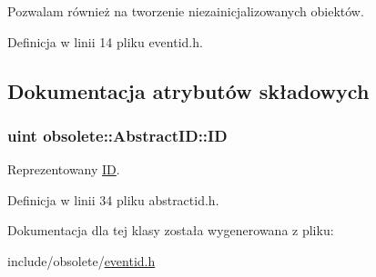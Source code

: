 Pozwalam również na tworzenie niezainicjalizowanych obiektów. 



Definicja w linii 14 pliku eventid.h.



\subsection{Dokumentacja atrybutów składowych}
\hypertarget{classobsolete_1_1AbstractID_a5f67fa1c7d96085f0ef41193b60b570c}{
\subsubsection[{ID}]{\setlength{\rightskip}{0pt plus 5cm}uint {\bf obsolete::AbstractID::ID}}}
\label{classobsolete_1_1AbstractID_a5f67fa1c7d96085f0ef41193b60b570c}


Reprezentowany \hyperlink{classobsolete_1_1ID}{ID}. 



Definicja w linii 34 pliku abstractid.h.



Dokumentacja dla tej klasy została wygenerowana z pliku:\begin{DoxyCompactItemize}
\item 
include/obsolete/\hyperlink{eventid_8h}{eventid.h}\end{DoxyCompactItemize}
